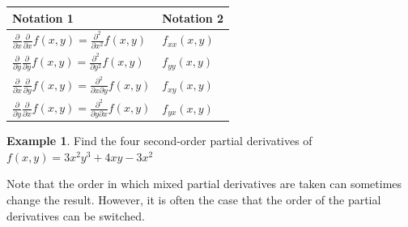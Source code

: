 \documentclass[
]{book}
\theoremstyle{definition}
\theoremstyle{definition}
\newtheorem{example}{Example}[chapter]
\theoremstyle{definition}
\theoremstyle{definition}
\theoremstyle{remark}
\begin{document}
\begin{longtable}[]{@{}ll@{}}
\toprule
\begin{minipage}[b]{0.47\columnwidth}\raggedright
Notation 1\strut
\end{minipage} & \begin{minipage}[b]{0.47\columnwidth}\raggedright
Notation 2\strut
\end{minipage}\tabularnewline
\midrule
\endhead
\begin{minipage}[t]{0.47\columnwidth}\raggedright
\(\frac{\partial}{\partial x}\frac{\partial}{\partial x} f(x, y) = \frac{\partial^2}{\partial x^2} f(x, y)\)\strut
\end{minipage} & \begin{minipage}[t]{0.47\columnwidth}\raggedright
\(f_{xx}(x, y)\)\strut
\end{minipage}\tabularnewline
\begin{minipage}[t]{0.47\columnwidth}\raggedright
\(\frac{\partial}{\partial y}\frac{\partial}{\partial y} f(x, y) = \frac{\partial^2}{\partial y^2} f(x, y)\)\strut
\end{minipage} & \begin{minipage}[t]{0.47\columnwidth}\raggedright
\(f_{yy}(x, y)\)\strut
\end{minipage}\tabularnewline
\begin{minipage}[t]{0.47\columnwidth}\raggedright
\(\frac{\partial}{\partial x}\frac{\partial}{\partial y} f(x, y) = \frac{\partial^2}{\partial x \partial y} f(x, y)\)\strut
\end{minipage} & \begin{minipage}[t]{0.47\columnwidth}\raggedright
\(f_{xy}(x, y)\)\strut
\end{minipage}\tabularnewline
\begin{minipage}[t]{0.47\columnwidth}\raggedright
\(\frac{\partial}{\partial y}\frac{\partial}{\partial x} f(x, y) = \frac{\partial^2}{\partial y \partial x} f(x, y)\)\strut
\end{minipage} & \begin{minipage}[t]{0.47\columnwidth}\raggedright
\(f_{yx}(x, y)\)\strut
\end{minipage}\tabularnewline
\bottomrule
\end{longtable}

\begin{example}
Find the four second-order partial derivatives of \(f(x, y) = 3x^2y^3 + 4xy - 3x^2\)
\end{example}

Note that the order in which mixed partial derivatives are taken can sometimes change the result. However, it is often the case that the order of the partial derivatives can be switched.
\end{document}
